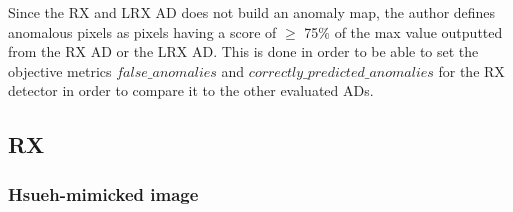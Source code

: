 Since the RX and LRX AD does not build an anomaly map, the author defines anomalous pixels as pixels having a score of $\geqslant$ 75\% of the max value outputted from the RX AD or the LRX AD. This is done in order to be able to set the objective metrics $false\_anomalies$ and $correctly\_predicted\_anomalies$ for the RX detector in order to compare it to the other evaluated ADs. 

\subsection{RX}
 

\subsubsection{Hsueh-mimicked image}

